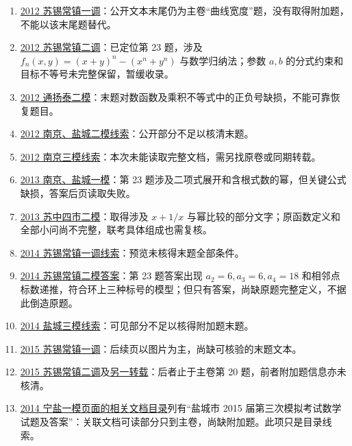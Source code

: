 \documentclass[UTF8]{ctexart}
\begin{document}
\begin{enumerate}
\item \href{https://www.1mpi.com/doc/9074c29f2b110b8bb634e626}{2012 苏锡常镇一调}：公开文本末尾仍为主卷“曲线宽度”题，没有取得附加题，不能以该末尾题替代。
\item \href{https://www.mianfeiwendang.com/doc/fbfc7ec96dd36d63a7bf9e7d/5}{2012 苏锡常镇二调}：已定位第 23 题，涉及 $f_n(x,y)=(x+y)^n-(x^n+y^n)$ 与数学归纳法；参数 $a,b$ 的分式约束和目标不等号未完整保留，暂缓收录。
\item \href{https://doc.xuehai.net/b82f390d6798cd90b0ed7c51f.html}{2012 通扬泰二模}：末题对数函数及乘积不等式中的正负号缺损，不能可靠恢复题目。
\item \href{https://www.51wendang.com/doc/517100508630501f27d3bf9d}{2012 南京、盐城二模线索}：公开部分不足以核清末题。
\item \href{https://doc.xuehai.net/b5cafa3f91746899ae088795f.html}{2012 南京三模线索}：本次未能读取完整文档，需另找原卷或同期转载。
\item \href{https://www.51wendang.com/doc/30287572122302d8cbc36f9e/7}{2013 南京、盐城一模}：第 23 题涉及二项式展开和含根式数的幂，但关键公式缺损，答案后页读取失败。
\item \href{https://doc.xuehai.net/b9a2cc392ff2ad5ca2fdcb82f.html}{2013 苏中四市二模}：取得涉及 $x+1/x$ 与幂比较的部分文字；原函数定义和全部小问尚不完整，联考具体组成也需复核。
\item \href{https://max.book118.com/html/2017/0331/98180636.shtm}{2014 苏锡常镇一调线索}：预览未核得末题全部条件。
\item \href{https://doc.xuehai.net/bd211a532a3be38c0302b5df3-8.html}{2014 苏锡常镇二模答案}：第 23 题答案出现 $a_2=6,a_3=6,a_4=18$ 和相邻点标数递推，符合环上三种标号的模型；但只有答案，尚缺原题完整定义，不据此倒造原题。
\item \href{https://doc.xuehai.net/b11a07d49cb418f9a37ccf351.html}{2014 盐城三模线索}：可见部分不足以核得附加题末题。
\item \href{https://doc.xuehai.net/babe53a180f948f2c555dad51.html}{2015 苏锡常镇一调}：后续页以图片为主，尚缺可核验的末题文本。
\item \href{https://doc.xuehai.net/b9341d44caa5719f543ac937a.html}{2015 苏锡常镇二调}及\href{https://www.mianfeiwendang.com/doc/8ec448b5e1bc8af6e7874d05}{另一转载}：后者止于主卷第 20 题，前者附加题信息亦未核清。
\item \href{https://www.51wendang.com/doc/b354a966ae74314766a3ac38}{2014 宁盐一模页面的相关文档目录}列有“盐城市 2015 届第三次模拟考试数学试题及答案”：关联文档可读部分只到主卷，尚缺附加题。此项只是目录线索。

\end{enumerate}
\end{document}
